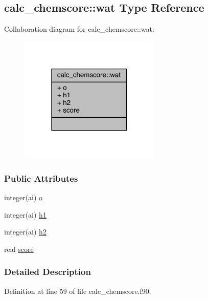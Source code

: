 \hypertarget{structcalc__chemscore_1_1wat}{\subsection{calc\-\_\-chemscore\-:\-:wat Type Reference}
\label{structcalc__chemscore_1_1wat}
}


Collaboration diagram for calc\-\_\-chemscore\-:\-:wat\-:
\nopagebreak
\begin{figure}[H]
\begin{center}
\leavevmode
\includegraphics[width=190pt]{structcalc__chemscore_1_1wat__coll__graph}
\end{center}
\end{figure}
\subsubsection*{Public Attributes}
\begin{DoxyCompactItemize}
\item 
integer(ai) \hyperlink{structcalc__chemscore_1_1wat_ae92261d880319f2bc8ba2cc84172623d}{o}
\item 
integer(ai) \hyperlink{structcalc__chemscore_1_1wat_ac24fafde9abc7332ae838bef57aad269}{h1}
\item 
integer(ai) \hyperlink{structcalc__chemscore_1_1wat_a842d5fdfaf7bb72f07e53b07b4185cf3}{h2}
\item 
real \hyperlink{structcalc__chemscore_1_1wat_a2e3ecfc1a3bb401e862c54ff6b7fd75e}{score}
\end{DoxyCompactItemize}


\subsubsection{Detailed Description}


Definition at line 59 of file calc\-\_\-chemscore.\-f90.



